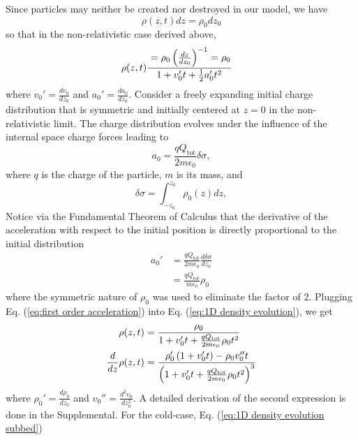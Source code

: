 \documentclass[aps,prl,twocolumn,showpacs,superscriptaddress,groupedaddress]{revtex4-1}  %
\begin{document}
{Since particles may neither be created nor destroyed in our model, we have
\begin{equation}
\rho(z,t) dz = \rho_0 dz_0
\end{equation}
so that in the non-relativistic case derived above,
\begin{align}
  \rho(z,t) &=  \rho_0 \left({dz\over dz_0}\right)^{-1} ={ \rho_0} \over  {1 + v_0' t +\frac{1}{2} a_0' t^2} \label{eq:1D density evolution}
\end{align}
where $v_0' = \frac{dv_0}{dz_0}$ 
and $a_0' =  \frac{da_0}{dz_0}$.
Consider a freely expanding initial charge distribution that is symmetric and initially centered at  
$z=0$ in the non-relativistic limit.   The charge distribution evolves under the influence of the internal space charge 
forces leading to
\begin{equation}\label{eq:delta acceleration}
  a_0 = \frac{q Q_\text{tot}}{2 m \epsilon_0}  {\delta \sigma},
\end{equation}
where $q$ is the charge of the particle, $m$ is its mass, and 
\begin{equation}
  \delta \sigma = \int_{-z_0}^{z_0} \rho_0(z) dz,
\end{equation}
Notice via the Fundamental Theorem of Calculus
that the derivative of the acceleration with respect to the initial position is
directly proportional to the initial distribution
\begin{align}\label{eq:first order acceleration}
  a_0' &= \frac{q Q_\text{tot}}{2 m \epsilon_0}  \frac{d{\delta \sigma}}{dz_0}\nonumber\\
          &= \frac{q Q_\text{tot}}{m \epsilon_0}\rho_0
\end{align}
where the symmetric nature of $\rho_0$ was used to eliminate the factor of $2$.
Plugging Eq. (\ref{eq:first order acceleration}) into Eq. (\ref{eq:1D density evolution}), we get
\begin{align}
  \rho(z,t) &=  { \rho_0 \over  1 + v_0' t +  \frac{q Q_\text{tot}}{2 m \epsilon_0} \rho_0t^2}\label{eq:1D density evolution subbed}\\
  \frac{d}{dz} \rho(z,t) &= \frac{ \rho_0'\left( 1  + v_0' t\right) - \rho_0v_0''t }{\left(1 + v_0' t +  \frac{q Q_\text{tot}}{2 m \epsilon_0} \rho_0t^2\right)^3}\label{eq:1D rho derivative} 
\end{align}
where $\rho_0' = \frac{d\rho_0}{dz_0}$ and $v_0'' = \frac{d^2v_0}{dz_0^2}$. A 
detailed derivation of the second expression is done in the Supplemental.  
For the cold-case, 
Eq. (\ref{eq:1D density evolution subbed}) 
}
\end{document}
